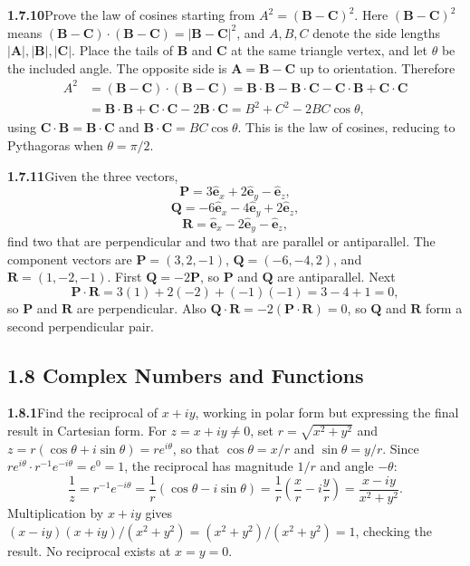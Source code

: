 \par\bigskip
\noindent\textbf{1.7.10}\quad Prove the law of cosines starting from
$A^{2}=(\mathbf{B}-\mathbf{C})^{2}$.
\solution
Here $(\mathbf B-\mathbf C)^2$ means
$(\mathbf B-\mathbf C)\cdot(\mathbf B-\mathbf C)=|\mathbf B-\mathbf C|^2$,
and $A,B,C$ denote the side lengths $|\mathbf A|,|\mathbf B|,|\mathbf C|$.
Place the tails of $\mathbf B$ and $\mathbf C$ at the same triangle
vertex, and let $\theta$ be the included angle. The opposite side is
$\mathbf A=\mathbf B-\mathbf C$ up to orientation. Therefore
\[
 \begin{aligned}
 A^2&=(\mathbf B-\mathbf C)\cdot(\mathbf B-\mathbf C)
 =\mathbf B\cdot\mathbf B-\mathbf B\cdot\mathbf C
  -\mathbf C\cdot\mathbf B+\mathbf C\cdot\mathbf C\\
 &=\mathbf B\cdot\mathbf B+\mathbf C\cdot\mathbf C
       -2\mathbf B\cdot\mathbf C
 =B^2+C^2-2BC\cos\theta,
 \end{aligned}
\]
using $\mathbf C\cdot\mathbf B=\mathbf B\cdot\mathbf C$ and
$\mathbf B\cdot\mathbf C=BC\cos\theta$.
This is the law of cosines, reducing to Pythagoras when $\theta=\pi/2$.


\par\bigskip
\noindent\textbf{1.7.11}\quad Given the three vectors,
\[
\mathbf{P}=3\hat{\mathbf{e}}_{x}+2\hat{\mathbf{e}}_{y}-\hat{\mathbf{e}}_{z},
\]
\[
\mathbf{Q}=-6\hat{\mathbf{e}}_{x}-4\hat{\mathbf{e}}_{y}+2\hat{\mathbf{e}}_{z},
\]
\[
\mathbf{R}=\hat{\mathbf{e}}_{x}-2\hat{\mathbf{e}}_{y}-\hat{\mathbf{e}}_{z},
\]
find two that are perpendicular and two that are parallel or antiparallel.
\solution
The component vectors are $\mathbf P=(3,2,-1)$,
$\mathbf Q=(-6,-4,2)$, and $\mathbf R=(1,-2,-1)$.
First $\mathbf Q=-2\mathbf P$, so $\mathbf P$ and $\mathbf Q$
are antiparallel. Next
\[
 \mathbf P\cdot\mathbf R=3(1)+2(-2)+(-1)(-1)=3-4+1=0,
\]
so $\mathbf P$ and $\mathbf R$ are perpendicular. Also
$\mathbf Q\cdot\mathbf R=-2(\mathbf P\cdot\mathbf R)=0$,
so $\mathbf Q$ and $\mathbf R$ form a second perpendicular pair.


\subsection*{1.8 Complex Numbers and Functions}

\par\bigskip
\noindent\textbf{1.8.1}\quad Find the reciprocal of $x+iy$, working in polar
form but expressing the final result in Cartesian form.
\solution
For $z=x+iy\ne0$, set $r=\sqrt{x^2+y^2}$ and
$z=r(\cos\theta+i\sin\theta)=re^{i\theta}$, so that
$\cos\theta=x/r$ and $\sin\theta=y/r$.
Since $re^{i\theta}\cdot r^{-1}e^{-i\theta}=e^0=1$, the reciprocal has
magnitude $1/r$ and angle $-\theta$:
\[
 \frac1z=r^{-1}e^{-i\theta}
 =\frac1r(\cos\theta-i\sin\theta)
 =\frac1r\left(\frac xr-i\frac yr\right)
 =\boxed{\frac{x-iy}{x^2+y^2}}.
\]
Multiplication by $x+iy$ gives $(x-iy)(x+iy)/(x^2+y^2)
=(x^2+y^2)/(x^2+y^2)=1$,
checking the result. No reciprocal exists at $x=y=0$.


